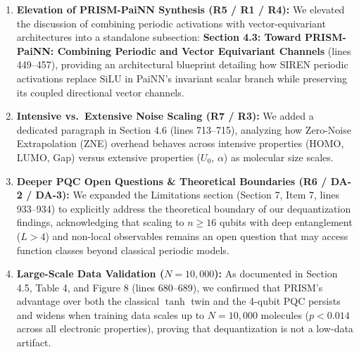 \documentclass[10pt,letterpaper]{article}
\begin{document}
\begin{enumerate}
    \item \textbf{Elevation of PRISM-PaiNN Synthesis (R5 / R1 / R4):} 
    We elevated the discussion of combining periodic activations with vector-equivariant architectures into a standalone subsection: \textbf{Section 4.3: Toward PRISM-PaiNN: Combining Periodic and Vector Equivariant Channels} (lines 449--457), providing an architectural blueprint detailing how SIREN periodic activations replace $\mathrm{SiLU}$ in PaiNN's invariant scalar branch while preserving its coupled directional vector channels.
    
    \item \textbf{Intensive vs.\ Extensive Noise Scaling (R7 / R3):} 
    We added a dedicated paragraph in Section 4.6 (lines 713--715), analyzing how Zero-Noise Extrapolation (ZNE) overhead behaves across intensive properties (HOMO, LUMO, Gap) versus extensive properties ($U_0$, $\alpha$) as molecular size scales.
    
    \item \textbf{Deeper PQC Open Questions \& Theoretical Boundaries (R6 / DA-2 / DA-3):} 
    We expanded the Limitations section (Section 7, Item 7, lines 933--934) to explicitly address the theoretical boundary of our dequantization findings, acknowledging that scaling to $n \ge 16$ qubits with deep entanglement ($L > 4$) and non-local observables remains an open question that may access function classes beyond classical periodic models.
    
    \item \textbf{Large-Scale Data Validation ($N=10{,}000$):} 
    As documented in Section 4.5, Table 4, and Figure 8 (lines 680--689), we confirmed that PRISM's advantage over both the classical $\tanh$ twin and the 4-qubit PQC persists and widens when training data scales up to $N = 10{,}000$ molecules ($p < 0.014$ across all electronic properties), proving that dequantization is not a low-data artifact.
\end{enumerate}
\end{document}
